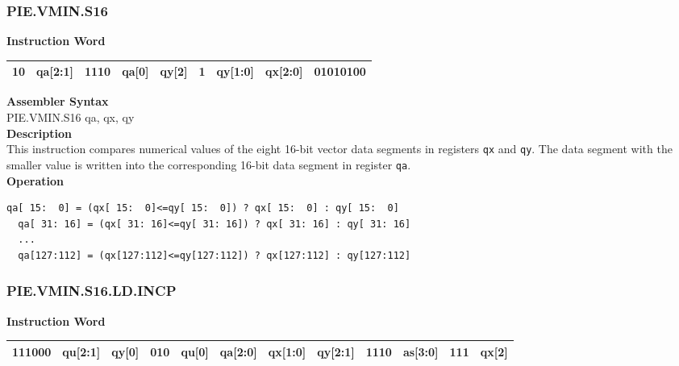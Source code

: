 \newpage
\subsubsection{PIE.VMIN.S16}\label{instruction:PIEVMINS16}
\setlength\tabcolsep{6pt}
\textbf{Instruction Word} \\
\begin{tabular}{|c|c|c|c|c|c|c|c|c|}
	\hline
	10 & qa[2:1] & 1110 & qa[0] & qy[2] & 1 & qy[1:0] & qx[2:0] & 01010100 \\
	\hline
\end{tabular}

\textbf{Assembler Syntax} \\
PIE.VMIN.S16 qa, qx, qy \\
\textbf{Description} \\
This instruction compares numerical values of the eight 16-bit vector data segments in registers \lstinline{qx} and \lstinline{qy}. The data segment with the smaller value is written into the corresponding 16-bit data segment in register \lstinline{qa}.\\
\textbf{Operation}
\begin{lstlisting}[escapeinside=`?]
  qa[ 15:  0] = (qx[ 15:  0]<=qy[ 15:  0]) ? qx[ 15:  0] : qy[ 15:  0]
  qa[ 31: 16] = (qx[ 31: 16]<=qy[ 31: 16]) ? qx[ 31: 16] : qy[ 31: 16]
  ...
  qa[127:112] = (qx[127:112]<=qy[127:112]) ? qx[127:112] : qy[127:112]
\end{lstlisting}

\newpage
\subsubsection{PIE.VMIN.S16.LD.INCP}\label{instruction:PIEVMINS16LDINCP}
\setlength\tabcolsep{6pt}
\textbf{Instruction Word} \\
\begin{tabular}{|c|c|c|c|c|c|c|c|c|c|c|c|}
	\hline
	111000 & qu[2:1] & qy[0] & 010 & qu[0] & qa[2:0] & qx[1:0] & qy[2:1] & 1110 & as[3:0] & 111 & qx[2] \\
	\hline
\end{tabular}

